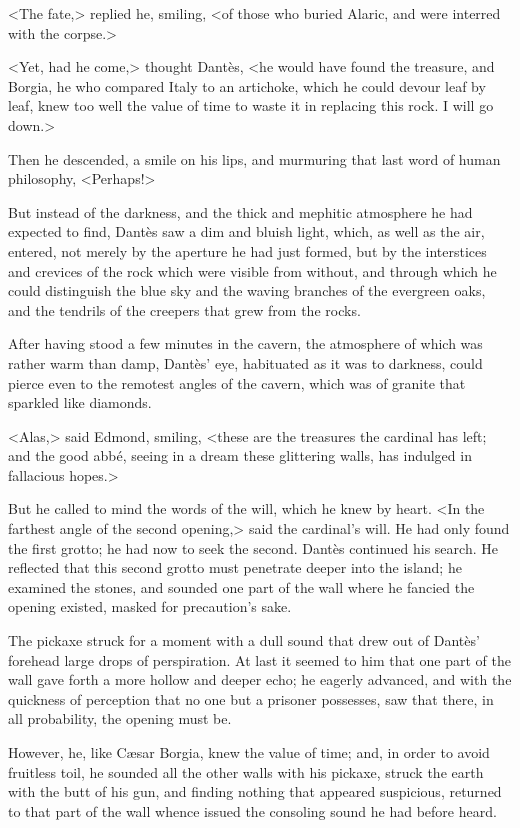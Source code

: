  <The fate,> replied he, smiling, <of those who buried Alaric, and were interred with the corpse.> 

 <Yet, had he come,> thought Dantès, <he would have found the treasure, and Borgia, he who compared Italy to an artichoke, which he could devour leaf by leaf, knew too well the value of time to waste it in replacing this rock. I will go down.> 

 Then he descended, a smile on his lips, and murmuring that last word of human philosophy, <Perhaps!> 

 But instead of the darkness, and the thick and mephitic atmosphere he had expected to find, Dantès saw a dim and bluish light, which, as well as the air, entered, not merely by the aperture he had just formed, but by the interstices and crevices of the rock which were visible from without, and through which he could distinguish the blue sky and the waving branches of the evergreen oaks, and the tendrils of the creepers that grew from the rocks. 

 After having stood a few minutes in the cavern, the atmosphere of which was rather warm than damp, Dantès' eye, habituated as it was to darkness, could pierce even to the remotest angles of the cavern, which was of granite that sparkled like diamonds. 

 <Alas,> said Edmond, smiling, <these are the treasures the cardinal has left; and the good abbé, seeing in a dream these glittering walls, has indulged in fallacious hopes.> 

 But he called to mind the words of the will, which he knew by heart. <In the farthest angle of the second opening,> said the cardinal's will. He had only found the first grotto; he had now to seek the second. Dantès continued his search. He reflected that this second grotto must penetrate deeper into the island; he examined the stones, and sounded one part of the wall where he fancied the opening existed, masked for precaution's sake. 

 The pickaxe struck for a moment with a dull sound that drew out of Dantès' forehead large drops of perspiration. At last it seemed to him that one part of the wall gave forth a more hollow and deeper echo; he eagerly advanced, and with the quickness of perception that no one but a prisoner possesses, saw that there, in all probability, the opening must be. 

 However, he, like Cæsar Borgia, knew the value of time; and, in order to avoid fruitless toil, he sounded all the other walls with his pickaxe, struck the earth with the butt of his gun, and finding nothing that appeared suspicious, returned to that part of the wall whence issued the consoling sound he had before heard. 

